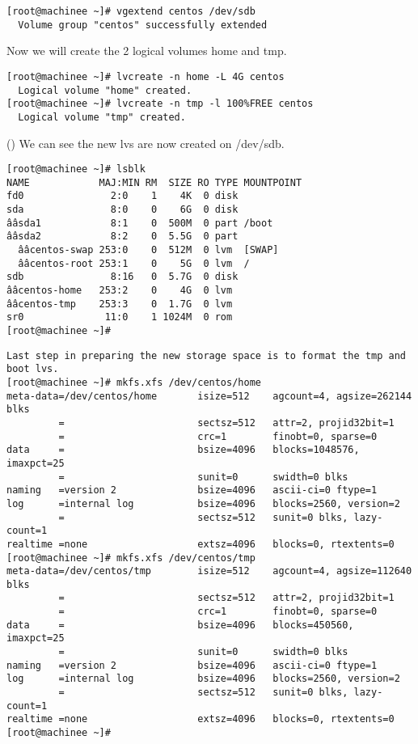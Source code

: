 \documentclass[11pt,onside]{article}
\begin{document}
\begin{lstlisting}
[root@machinee ~]# vgextend centos /dev/sdb
  Volume group "centos" successfully extended
\end{lstlisting}
Now we will create the 2 logical volumes home and tmp.
\begin{lstlisting}
[root@machinee ~]# lvcreate -n home -L 4G centos
  Logical volume "home" created.
[root@machinee ~]# lvcreate -n tmp -l 100%FREE centos
  Logical volume "tmp" created.
\end{lstlisting}
\clearpage()
We can see the new lvs are now created on /dev/sdb.
\begin{lstlisting}
[root@machinee ~]# lsblk
NAME            MAJ:MIN RM  SIZE RO TYPE MOUNTPOINT
fd0               2:0    1    4K  0 disk
sda               8:0    0    6G  0 disk
ââsda1            8:1    0  500M  0 part /boot
ââsda2            8:2    0  5.5G  0 part
  ââcentos-swap 253:0    0  512M  0 lvm  [SWAP]
  ââcentos-root 253:1    0    5G  0 lvm  /
sdb               8:16   0  5.7G  0 disk
ââcentos-home   253:2    0    4G  0 lvm
ââcentos-tmp    253:3    0  1.7G  0 lvm
sr0              11:0    1 1024M  0 rom
[root@machinee ~]#
\end{lstlisting}
\begin{lstlisting}
Last step in preparing the new storage space is to format the tmp and boot lvs.
[root@machinee ~]# mkfs.xfs /dev/centos/home
meta-data=/dev/centos/home       isize=512    agcount=4, agsize=262144 blks
         =                       sectsz=512   attr=2, projid32bit=1
         =                       crc=1        finobt=0, sparse=0
data     =                       bsize=4096   blocks=1048576, imaxpct=25
         =                       sunit=0      swidth=0 blks
naming   =version 2              bsize=4096   ascii-ci=0 ftype=1
log      =internal log           bsize=4096   blocks=2560, version=2
         =                       sectsz=512   sunit=0 blks, lazy-count=1
realtime =none                   extsz=4096   blocks=0, rtextents=0
[root@machinee ~]# mkfs.xfs /dev/centos/tmp
meta-data=/dev/centos/tmp        isize=512    agcount=4, agsize=112640 blks
         =                       sectsz=512   attr=2, projid32bit=1
         =                       crc=1        finobt=0, sparse=0
data     =                       bsize=4096   blocks=450560, imaxpct=25
         =                       sunit=0      swidth=0 blks
naming   =version 2              bsize=4096   ascii-ci=0 ftype=1
log      =internal log           bsize=4096   blocks=2560, version=2
         =                       sectsz=512   sunit=0 blks, lazy-count=1
realtime =none                   extsz=4096   blocks=0, rtextents=0
[root@machinee ~]#
\end{lstlisting}
\end{document}
